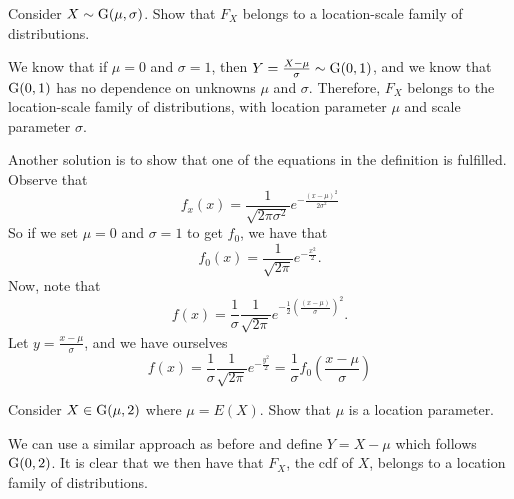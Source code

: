 \documentclass[notoc,notitlepage]{tufte-book}
\begin{document}
\begin{eg}[Example 2.13]
  Consider $X \sim \operatorname{G}(\mu, \sigma)$. Show that $F_X$ belongs to a location-scale family of distributions.

  We know that if $\mu = 0$ and $\sigma = 1$, then $Y = \frac{X - \mu}{\sigma} \sim \operatorname{G}(0, 1)$, and we know that $\operatorname{G}(0, 1)$ has no dependence on unknowns $\mu$ and $\sigma$. Therefore, $F_X$ belongs to the location-scale family of distributions, with location parameter $\mu$ and scale parameter $\sigma$.

  Another solution is to show that one of the equations in the definition is fulfilled. Observe that
  \begin{equation*}
    f_x(x) = \frac{1}{\sqrt{2 \pi \sigma^2}} e^{- \frac{(x - \mu)^2}{2 \sigma^2}}
  \end{equation*}
  So if we set $\mu = 0$ and $\sigma = 1$ to get $f_0$, we have that
  \begin{equation*}
    f_0(x) = \frac{1}{\sqrt{2 \pi}} e^{- \frac{x^2}{2}}.
  \end{equation*}
  Now, note that
  \begin{equation*}
    f(x) = \frac{1}{\sigma} \frac{1}{\sqrt{2 \pi}} e^{- \frac{1}{2} \left(\frac{(x - \mu)}{\sigma}\right)^2}.
  \end{equation*}
  Let $y = \frac{x - \mu}{\sigma}$, and we have ourselves
  \begin{equation*}
    f(x) = \frac{1}{\sigma} \frac{1}{\sqrt{2 \pi}} e^{- \frac{y^2}{2}} = \frac{1}{\sigma} f_0 (\frac{x - \mu}{\sigma})
  \end{equation*}
\end{eg}

\begin{eg}[Example 2.14]
  Consider $X \in \operatorname{G}(\mu, 2)$ where $\mu = E(X)$. Show that $\mu$ is a location parameter.

  We can use a similar approach as before and define $Y = X - \mu$ which follows $\operatorname{G}(0, 2)$. It is clear that we then have that $F_X$, the cdf of $X$, belongs to a location family of distributions.
\end{eg}
\end{document}
